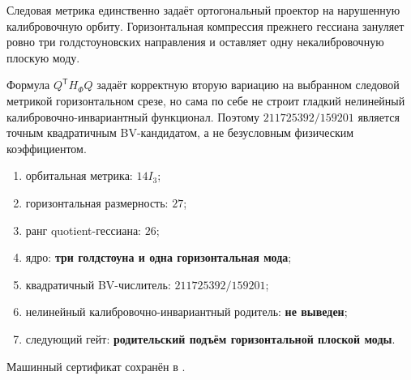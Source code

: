 \begin{theorem}
Следовая метрика единственно задаёт ортогональный проектор на нарушенную
калибровочную орбиту. Горизонтальная компрессия прежнего гессиана
зануляет ровно три голдстоуновских направления и оставляет одну
некалибровочную плоскую моду.
\end{theorem}

\begin{nogocriterion}
Формула $Q^{\mathsf T}H_{\Phi}Q$ задаёт корректную вторую вариацию на
выбранном следовой метрикой горизонтальном срезе, но сама по себе не строит
гладкий нелинейный калибровочно-инвариантный функционал. Поэтому
$211725392/159201$ является точным квадратичным BV-кандидатом, а не
безусловным физическим коэффициентом.
\end{nogocriterion}

\begin{protocol}
\begin{enumerate}
 \item орбитальная метрика: \textbf{$14I_3$};
 \item горизонтальная размерность: \textbf{$27$};
 \item ранг quotient-гессиана: \textbf{$26$};
 \item ядро: \textbf{три голдстоуна и одна горизонтальная мода};
 \item квадратичный BV-числитель: \textbf{$211725392/159201$};
 \item нелинейный калибровочно-инвариантный родитель: \textbf{не выведен};
 \item следующий гейт: \textbf{родительский подъём горизонтальной плоской
 моды}.
\end{enumerate}
\end{protocol}

Машинный сертификат сохранён в
.